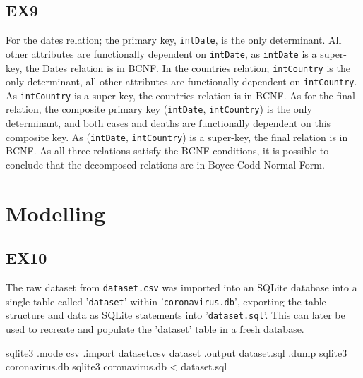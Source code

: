 \documentclass[]{article}
\begin{document}
\subsection{EX9}
For the dates relation; the primary key, \verb|intDate|, is the only determinant. All other attributes are functionally dependent on \verb|intDate|, as \verb|intDate| is a super-key, the Dates relation is in BCNF. In the countries relation; \verb|intCountry| is the only determinant, all other attributes are functionally dependent on \verb|intCountry|. As \verb|intCountry| is a super-key, the countries relation is in BCNF. As for the final relation, the composite primary key (\verb|intDate|, \verb|intCountry|) is the only determinant, and both cases and deaths are functionally dependent on this composite key. As (\verb|intDate|, \verb|intCountry|) is a super-key, the final relation is in BCNF. As all three relations satisfy the BCNF conditions, it is possible to conclude that the decomposed relations are in Boyce-Codd Normal Form.
\section{Modelling}
\subsection{EX10}
The raw dataset from \verb|dataset.csv| was imported into an SQLite database into a single table called '\verb|dataset|' within '\verb|coronavirus.db|', exporting the table structure and data as SQLite statements into '\verb|dataset.sql|'. This can later be used to recreate and populate the 'dataset' table in a fresh database.
\begin{ffcode}
sqlite3
.mode csv
.import dataset.csv dataset
.output dataset.sql
.dump
sqlite3 coronavirus.db
sqlite3 coronavirus.db < dataset.sql
\end{ffcode}
\end{document}
